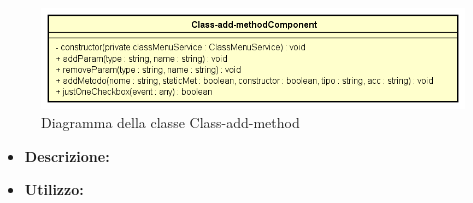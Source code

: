 \begin{figure}[h!]
	\centering
	\includegraphics[scale=0.8]{res/sections/SpecificaFrontEnd/Components/Disegnetti/class-add-method.png}
	\caption{Diagramma della classe Class-add-method}
\end{figure}

\begin{itemize}
	\item \textbf{Descrizione:}\\
	
	\item \textbf{Utilizzo:}\\
	

\end{itemize}
